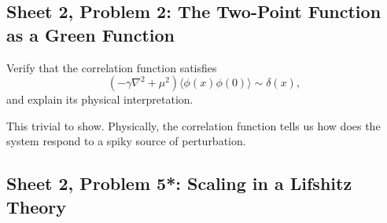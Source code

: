 \subsection{Sheet 2, Problem 2: The Two-Point Function as a Green Function}

Verify that the correlation function satisfies
\begin{equation}
    (-\gamma\nabla^2+\mu^2)\langle\phi(x)\phi(0)\rangle
    \sim\delta(x),
\end{equation}
and explain its physical interpretation.
\begin{solution}
    This trivial to show. Physically, the correlation function tells us how does the system respond to a spiky source of perturbation.
\end{solution}

\subsection{Sheet 2, Problem 5*: Scaling in a Lifshitz Theory}

